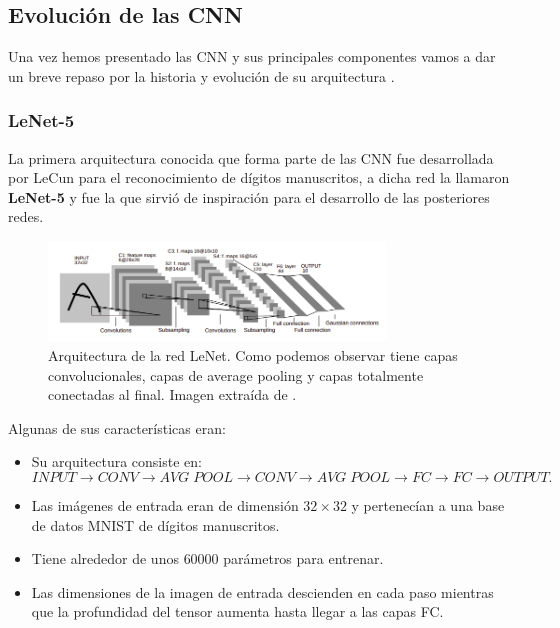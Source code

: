         \subsection{Evolución de las CNN}
        Una vez hemos presentado las CNN y sus principales componentes vamos a dar un breve repaso por la historia y evolución de su arquitectura \cite{EvolutionCNN}.

        \subsubsection{LeNet-5}
            \noindent La primera arquitectura conocida que forma parte de las CNN fue desarrollada por LeCun \cite{lecun1998gradient} para el reconocimiento de dígitos manuscritos, a dicha red la llamaron \textbf{LeNet-5} y fue la que sirvió de inspiración para el desarrollo de las posteriores redes.

            \begin{figure}[!h]
                \centering
                \includegraphics[width=0.8\textwidth]{img/LeNet.png}
                \caption{Arquitectura de la red LeNet. Como podemos observar tiene capas convolucionales, capas de average pooling y capas totalmente conectadas al final. Imagen extraída de \cite{lecun1998gradient}.}
                \label{fig:LeNet}
            \end{figure}

            \noindent Algunas de sus características eran: 

            \begin{itemize}
                \item Su arquitectura consiste en: 
                $$INPUT \rightarrow CONV \rightarrow AVG\;POOL \rightarrow CONV \rightarrow AVG \; POOL \rightarrow FC \rightarrow FC \rightarrow OUTPUT.$$
                \item Las imágenes de entrada eran de dimensión $32 \times 32$ y pertenecían a una base de datos MNIST de dígitos manuscritos.
                \item Tiene alrededor de unos $60000$ parámetros para entrenar.
                \item Las dimensiones de la imagen de entrada descienden en cada paso mientras que la profundidad del tensor aumenta hasta llegar a las capas FC.
            \end{itemize}

